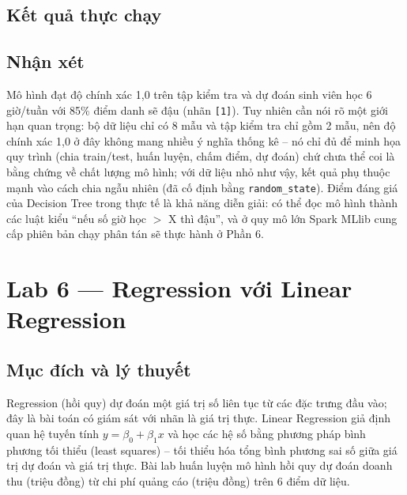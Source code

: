 \documentclass[12pt,a4paper,oneside]{article}
\begin{document}


\subsection{Kết quả thực chạy}



\subsection{Nhận xét}

Mô hình đạt độ chính xác 1{,}0 trên tập kiểm tra và dự đoán sinh viên học 6 giờ/tuần với 85\% điểm danh sẽ đậu (nhãn \texttt{[1]}). Tuy nhiên cần nói rõ một giới hạn quan trọng: bộ dữ liệu chỉ có 8 mẫu và tập kiểm tra chỉ gồm 2 mẫu, nên độ chính xác 1{,}0 ở đây không mang nhiều ý nghĩa thống kê -- nó chỉ đủ để minh họa quy trình (chia train/test, huấn luyện, chấm điểm, dự đoán) chứ chưa thể coi là bằng chứng về chất lượng mô hình; với dữ liệu nhỏ như vậy, kết quả phụ thuộc mạnh vào cách chia ngẫu nhiên (đã cố định bằng \texttt{random\_state}). Điểm đáng giá của Decision Tree trong thực tế là khả năng diễn giải: có thể đọc mô hình thành các luật kiểu ``nếu số giờ học $>$ X thì đậu'', và ở quy mô lớn Spark MLlib cung cấp phiên bản chạy phân tán sẽ thực hành ở Phần 6.

\section{Lab 6 --- Regression với Linear Regression}

\subsection{Mục đích và lý thuyết}

Regression (hồi quy) dự đoán một giá trị số liên tục từ các đặc trưng đầu vào; đây là bài toán có giám sát với nhãn là giá trị thực. Linear Regression giả định quan hệ tuyến tính $y = \beta_0 + \beta_1 x$ và học các hệ số bằng phương pháp bình phương tối thiểu (least squares) -- tối thiểu hóa tổng bình phương sai số giữa giá trị dự đoán và giá trị thực. Bài lab huấn luyện mô hình hồi quy dự đoán doanh thu (triệu đồng) từ chi phí quảng cáo (triệu đồng) trên 6 điểm dữ liệu.
\end{document}

